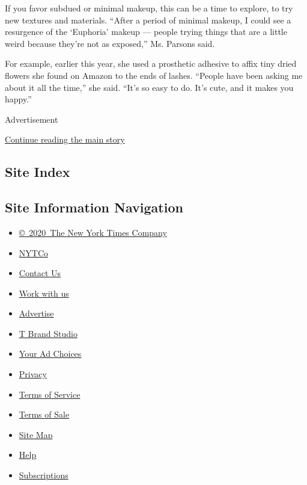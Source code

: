 If you favor subdued or minimal makeup, this can be a time to explore,
to try new textures and materials. ``After a period of minimal makeup, I
could see a resurgence of the `Euphoria' makeup --- people trying things
that are a little weird because they're not as exposed,'' Ms. Parsons
said.

For example, earlier this year, she used a prosthetic adhesive to affix
tiny dried flowers she found on Amazon to the ends of lashes. ``People
have been asking me about it all the time,'' she said. ``It's so easy to
do. It's cute, and it makes you happy.''

Advertisement

\protect\hyperlink{after-bottom}{Continue reading the main story}

\hypertarget{site-index}{%
\subsection{Site Index}\label{site-index}}

\hypertarget{site-information-navigation}{%
\subsection{Site Information
Navigation}\label{site-information-navigation}}

\begin{itemize}
\tightlist
\item
  \href{https://help.nytimes3xbfgragh.onion/hc/en-us/articles/115014792127-Copyright-notice}{©~2020~The
  New York Times Company}
\end{itemize}

\begin{itemize}
\tightlist
\item
  \href{https://www.nytco.com/}{NYTCo}
\item
  \href{https://help.nytimes3xbfgragh.onion/hc/en-us/articles/115015385887-Contact-Us}{Contact
  Us}
\item
  \href{https://www.nytco.com/careers/}{Work with us}
\item
  \href{https://nytmediakit.com/}{Advertise}
\item
  \href{http://www.tbrandstudio.com/}{T Brand Studio}
\item
  \href{https://www.nytimes3xbfgragh.onion/privacy/cookie-policy\#how-do-i-manage-trackers}{Your
  Ad Choices}
\item
  \href{https://www.nytimes3xbfgragh.onion/privacy}{Privacy}
\item
  \href{https://help.nytimes3xbfgragh.onion/hc/en-us/articles/115014893428-Terms-of-service}{Terms
  of Service}
\item
  \href{https://help.nytimes3xbfgragh.onion/hc/en-us/articles/115014893968-Terms-of-sale}{Terms
  of Sale}
\item
  \href{https://spiderbites.nytimes3xbfgragh.onion}{Site Map}
\item
  \href{https://help.nytimes3xbfgragh.onion/hc/en-us}{Help}
\item
  \href{https://www.nytimes3xbfgragh.onion/subscription?campaignId=37WXW}{Subscriptions}
\end{itemize}
